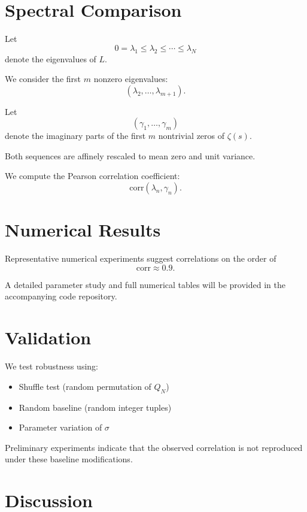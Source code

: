 \documentclass[11pt]{article}
\begin{document}
	\section{Spectral Comparison}
	
	Let
	\[
	0 = \lambda_1 \le \lambda_2 \le \cdots \le \lambda_N
	\]
	denote the eigenvalues of $L$.
	
	We consider the first $m$ nonzero eigenvalues:
	\[
	(\lambda_2, \dots, \lambda_{m+1}).
	\]
	
	Let
	\[
	(\gamma_1, \dots, \gamma_m)
	\]
	denote the imaginary parts of the first $m$ nontrivial zeros of $\zeta(s)$.
	
	Both sequences are affinely rescaled to mean zero and unit variance.
	
	We compute the Pearson correlation coefficient:
	\[
	\mathrm{corr}(\lambda_n, \gamma_n).
	\]
	
	\section{Numerical Results}
	
	Representative numerical experiments suggest correlations on the order of
	\[
	\mathrm{corr} \approx 0.9.
	\]
	
	A detailed parameter study and full numerical tables will be provided in the accompanying code repository.
	
	\section{Validation}
	
	We test robustness using:
	
	\begin{itemize}
		\item Shuffle test (random permutation of $Q_N$)
		\item Random baseline (random integer tuples)
		\item Parameter variation of $\sigma$
	\end{itemize}
	
	Preliminary experiments indicate that the observed correlation is not reproduced under these baseline modifications.
	
	\section{Discussion}
	
\end{document}
